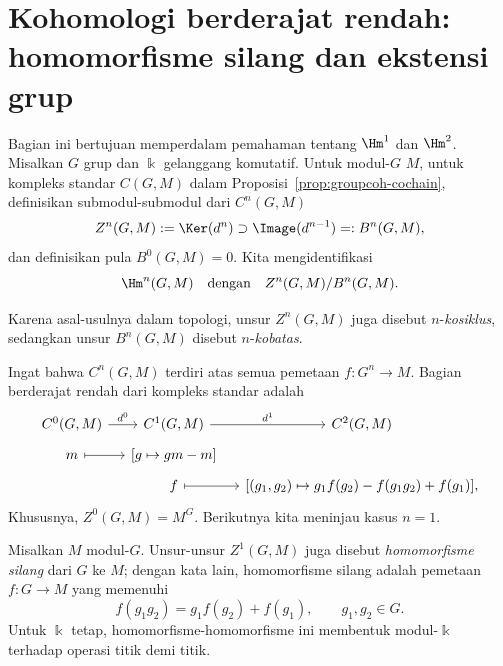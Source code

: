 
\section{Kohomologi berderajat rendah: homomorfisme silang dan ekstensi grup}
\label{sec:grp-low-degree}
\hypertarget{o014.aljabr2.chapter6.low-degree-cohomology}{ }

Bagian ini bertujuan memperdalam pemahaman tentang $\Hm^1$ dan $\Hm^2$.
Misalkan $G$ grup dan $\Bbbk$ gelanggang komutatif. Untuk modul-$G$ $M$,
untuk kompleks standar $C(G,M)$ dalam Proposisi~\ref{prop:groupcoh-cochain},
definisikan submodul-submodul dari $C^n(G,M)$
\[ Z^n(G,M):=\Ker(d^n)\supset\Image(d^{n-1})=:B^n(G,M), \]
dan definisikan pula $B^0(G,M)=0$. Kita mengidentifikasi
\begin{equation*}
	\Hm^n(G,M)\quad\text{dengan}\quad Z^n(G,M)/B^n(G,M).
\end{equation*}

Karena asal-usulnya dalam topologi, unsur $Z^n(G,M)$ juga disebut
$n$-\emph{kosiklus}, sedangkan unsur $B^n(G,M)$ disebut
$n$-\emph{kobatas}.

Ingat bahwa $C^n(G,M)$ terdiri atas semua pemetaan $f:G^n\to M$. Bagian
berderajat rendah dari kompleks standar adalah
\[\begin{tikzcd}[row sep=tiny, column sep=small]
	C^0(G,M) \arrow[r,"{d^0}"] & C^1(G,M) \arrow[r,"{d^1}"] & C^2(G,M) \\
	m \arrow[mapsto,r] & {[g\mapsto gm-m]} & \\
	& f \arrow[mapsto,r] &
	{[(g_1,g_2)\mapsto g_1f(g_2)-f(g_1g_2)+f(g_1)]},
\end{tikzcd}\]
Khususnya, $Z^0(G,M)=M^G$. Berikutnya kita meninjau kasus $n=1$.

\begin{definition}\label{def:crossed-homomorphism}
	Misalkan $M$ modul-$G$. Unsur-unsur $Z^1(G,M)$ juga disebut
	\emph{homomorfisme silang} dari $G$ ke $M$; dengan kata lain,
	homomorfisme silang adalah pemetaan $f:G\to M$ yang memenuhi
	\[ f(g_1g_2)=g_1f(g_2)+f(g_1),\qquad g_1,g_2\in G. \]
	Untuk $\Bbbk$ tetap, homomorfisme-homomorfisme ini membentuk
	modul-$\Bbbk$ terhadap operasi titik demi titik.
\end{definition}

